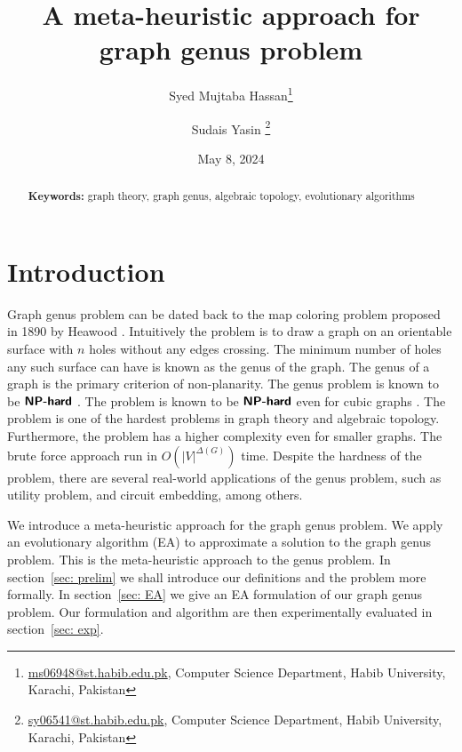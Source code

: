 \documentclass{article}
\newcommand{\classX}[1]{\ensuremath{\text{\textsf{\textbf{#1}}}}}
\newcommand{\NPH}{\classX{NP-hard}}
\begin{document}
\title{A meta-heuristic approach for graph genus problem}
\author{Syed Mujtaba Hassan\footnote{\url{ms06948@st.habib.edu.pk}, Computer Science Department, Habib University, Karachi, Pakistan} \and Sudais Yasin \footnote{\url{sy06541@st.habib.edu.pk}, Computer Science Department, Habib University, Karachi, Pakistan}}
\date{May 8, 2024}
\maketitle


\begin{abstract}

    \noindent\textbf{Keywords:} graph theory, graph genus, algebraic topology, evolutionary algorithms
\end{abstract}


\renewcommand\thefootnote{}


\renewcommand\thefootnote{\fnsymbol{footnote}}
\setcounter{footnote}{1}
\section{Introduction}\label{sec1}
    Graph genus problem can be dated back to the map coloring problem proposed in 1890 by Heawood \cite{Liangxia23}.
    Intuitively the problem is to draw a graph on an orientable surface with $n$ holes without any edges crossing. 
    The minimum number of holes any such surface can have is known as the genus of the graph. The genus of a graph is the primary criterion of non-planarity.
    The genus problem is known to be $\NPH$ \cite{Thomassen89}. The problem is known to be $\NPH$ even for cubic graphs \cite{Thomassen97}.
    The problem is one of the hardest problems in graph theory and algebraic topology. Furthermore, the problem has a higher complexity even for smaller graphs. The brute force approach run in $O(|V|^{\Delta(G)})$ time. 
    Despite the hardness of the problem, there are several real-world applications of the genus problem, such as utility problem, and circuit embedding, among others.

    We introduce a meta-heuristic approach for the graph genus problem. We apply an evolutionary algorithm (EA) to approximate a solution to the graph genus problem. 
    This is the meta-heuristic approach to the genus problem. In section~\ref{sec: prelim} we shall introduce our definitions and the problem more formally.
    In section~\ref{sec: EA} we give an EA formulation of our graph genus problem. Our formulation and algorithm are then experimentally evaluated in section~\ref{sec: exp}.
\end{document}
